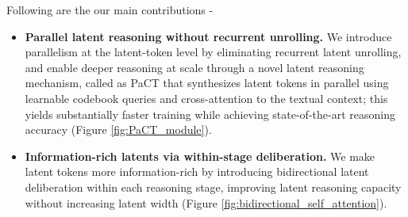 Following are the our main contributions -
\begin{itemize} \itemsep0pt  
    \item \textbf{Parallel latent reasoning without recurrent unrolling.}
    We introduce parallelism at the latent-token level by eliminating recurrent latent unrolling, and enable deeper reasoning at scale through a novel latent reasoning mechanism, called as PaCT that synthesizes latent tokens in parallel using learnable codebook queries and cross-attention to the textual context; this yields substantially faster training while achieving state-of-the-art reasoning accuracy (Figure \ref{fig:PaCT_module}).
    \item \textbf{Information-rich latents via within-stage deliberation.}
    We make latent tokens more information-rich by introducing bidirectional latent deliberation within each reasoning stage, improving latent reasoning capacity without increasing latent width (Figure \ref{fig:bidirectional_self_attention}).
\end{itemize}

